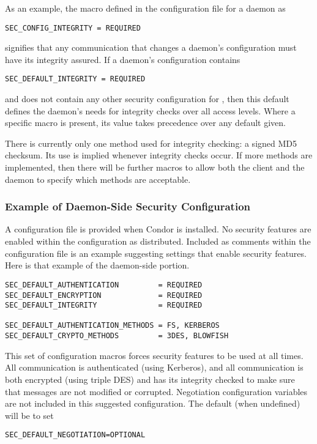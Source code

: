 As an example, the macro defined in the configuration file
for a daemon as
\begin{verbatim}
SEC_CONFIG_INTEGRITY = REQUIRED
\end{verbatim}
signifies that any communication that changes a daemon's configuration
must have its integrity assured.
If a daemon's configuration contains
\begin{verbatim}
SEC_DEFAULT_INTEGRITY = REQUIRED
\end{verbatim}
and does not contain any other security configuration for
\verb@INTEGRITY@, then this default defines the daemon's needs
for integrity checks over all access levels.
Where a specific macro is present, its value takes
precedence over any default given.

There is currently only one method used for integrity checking:
a signed MD5 checksum.
Its use is implied whenever integrity checks occur.
If more methods are implemented, then there will be further
macros to allow both the client and the daemon to specify
which methods are acceptable.

\subsubsection{\label{sec:Security-sample1} Example of Daemon-Side Security Configuration}

A configuration file is provided when Condor is installed.
No security features are enabled within the configuration as
distributed.
Included as comments within the configuration file is an example 
suggesting settings that enable security features.
Here is that example of the daemon-side portion.

\footnotesize
\begin{verbatim}
SEC_DEFAULT_AUTHENTICATION         = REQUIRED
SEC_DEFAULT_ENCRYPTION             = REQUIRED
SEC_DEFAULT_INTEGRITY              = REQUIRED

SEC_DEFAULT_AUTHENTICATION_METHODS = FS, KERBEROS
SEC_DEFAULT_CRYPTO_METHODS         = 3DES, BLOWFISH
\end{verbatim}
\normalsize

This set of configuration macros forces security features
to be used at all times.
All communication is authenticated (using Kerberos),
and all communication is both encrypted
(using triple DES)
and has its
integrity checked to make sure that messages
are not modified or corrupted.
Negotiation configuration variables are not included in this
suggested configuration.
The default (when undefined) will be to set
\begin{verbatim}
SEC_DEFAULT_NEGOTIATION=OPTIONAL
\end{verbatim}


